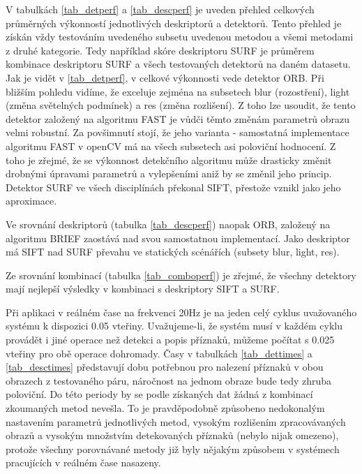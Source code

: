 





V tabulkách \ref{tab_detperf} a \ref{tab_descperf} je uveden přehled celkových průměrných výkonností jednotlivých deskriptorů
a detektorů. Tento přehled je získán vždy testováním uvedeného subsetu uvedenou metodou a všemi
metodami z druhé kategorie. Tedy například skóre deskriptoru SURF je průměrem kombinace
deskriptoru SURF a všech testovaných detektorů na daném datasetu.
Jak je vidět v \ref{tab_detperf}, v celkové výkonnosti vede detektor ORB. Při bližším pohledu vidíme, že exceluje
zejména na subsetech blur (rozostření), light (změna světelných podmínek) a res (změna rozlišení).
Z toho lze usoudit, že tento detektor založený na algoritmu FAST je vůdči těmto změnám parametrů obrazu
velmi robustní. Za povšimnutí stojí, že jeho varianta - samostatná implementace algoritmu FAST 
v openCV má na všech subsetech asi poloviční hodnocení. Z toho je zřejmé, že se výkonnost detekčního
algoritmu může drasticky změnit drobnými úpravami parametrů a vylepšeními aniž by se změnil jeho princip.
Detektor SURF ve všech disciplínách překonal SIFT, přestože vznikl jako jeho aproximace.

Ve srovnání deskriptorů (tabulka \ref{tab_descperf}) naopak ORB, založený na algoritmu BRIEF zaostává nad svou samostatnou implementací.
Jako deskriptor má SIFT nad SURF převahu ve statických scénářích (subsety blur, light, res).

Ze srovnání kombinací (tabulka \ref{tab_comboperf}) je zřejmé, že všechny detektory mají nejlepší výsledky v kombinaci s deskriptory SIFT a SURF.

Při aplikaci v reálném čase na frekvenci 20Hz je na jeden celý cyklus uvažovaného systému k dispozici 0.05 vteřiny. Uvažujeme-li, že systém musí v každém cyklu provádět i jiné operace než detekci a popis příznaků, můžeme počítat s 0.025 vteřiny pro obě operace dohromady. Časy v tabulkách \ref{tab_dettimes} a \ref{tab_desctimes} představují dobu potřebnou pro nalezení příznaků v obou obrazech z testovaného páru, náročnost na jednom obraze bude tedy zhruba poloviční. Do této periody by se podle získaných dat žádná z kombinací zkoumaných metod nevešla. To je pravděpodobně způsobeno nedokonalým nastavením parametrů jednotlivých metod, vysokým rozlišením zpracovávaných obrazů a vysokým množstvím detekovaných příznaků (nebylo nijak omezeno), protože všechny porovnávané metody již byly nějakým způsobem v systémech pracujících v reálném čase nasazeny.

